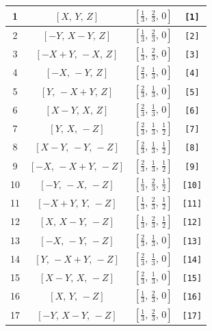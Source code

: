 \documentclass[fleqn,8pt]{jsarticle}
\begin{document}
\begin{longtable}{cccc}
1 & $\left[ X,\, Y,\, Z \right]$ & $\left[ \frac{1}{3},\, \frac{2}{3},\, 0 \right]$ & {\tt [1]} \\ \hline
2 & $\left[ - Y,\, X - Y,\, Z \right]$ & $\left[ \frac{1}{3},\, \frac{2}{3},\, 0 \right]$ & {\tt [2]} \\ \hline
3 & $\left[ - X + Y,\, - X,\, Z \right]$ & $\left[ \frac{1}{3},\, \frac{2}{3},\, 0 \right]$ & {\tt [3]} \\ \hline
4 & $\left[ - X,\, - Y,\, Z \right]$ & $\left[ \frac{2}{3},\, \frac{1}{3},\, 0 \right]$ & {\tt [4]} \\ \hline
5 & $\left[ Y,\, - X + Y,\, Z \right]$ & $\left[ \frac{2}{3},\, \frac{1}{3},\, 0 \right]$ & {\tt [5]} \\ \hline
6 & $\left[ X - Y,\, X,\, Z \right]$ & $\left[ \frac{2}{3},\, \frac{1}{3},\, 0 \right]$ & {\tt [6]} \\ \hline
7 & $\left[ Y,\, X,\, - Z \right]$ & $\left[ \frac{2}{3},\, \frac{1}{3},\, \frac{1}{2} \right]$ & {\tt [7]} \\ \hline
8 & $\left[ X - Y,\, - Y,\, - Z \right]$ & $\left[ \frac{2}{3},\, \frac{1}{3},\, \frac{1}{2} \right]$ & {\tt [8]} \\ \hline
9 & $\left[ - X,\, - X + Y,\, - Z \right]$ & $\left[ \frac{2}{3},\, \frac{1}{3},\, \frac{1}{2} \right]$ & {\tt [9]} \\ \hline
10 & $\left[ - Y,\, - X,\, - Z \right]$ & $\left[ \frac{1}{3},\, \frac{2}{3},\, \frac{1}{2} \right]$ & {\tt [10]} \\ \hline
11 & $\left[ - X + Y,\, Y,\, - Z \right]$ & $\left[ \frac{1}{3},\, \frac{2}{3},\, \frac{1}{2} \right]$ & {\tt [11]} \\ \hline
12 & $\left[ X,\, X - Y,\, - Z \right]$ & $\left[ \frac{1}{3},\, \frac{2}{3},\, \frac{1}{2} \right]$ & {\tt [12]} \\ \hline
13 & $\left[ - X,\, - Y,\, - Z \right]$ & $\left[ \frac{2}{3},\, \frac{1}{3},\, 0 \right]$ & {\tt [13]} \\ \hline
14 & $\left[ Y,\, - X + Y,\, - Z \right]$ & $\left[ \frac{2}{3},\, \frac{1}{3},\, 0 \right]$ & {\tt [14]} \\ \hline
15 & $\left[ X - Y,\, X,\, - Z \right]$ & $\left[ \frac{2}{3},\, \frac{1}{3},\, 0 \right]$ & {\tt [15]} \\ \hline
16 & $\left[ X,\, Y,\, - Z \right]$ & $\left[ \frac{1}{3},\, \frac{2}{3},\, 0 \right]$ & {\tt [16]} \\ \hline
17 & $\left[ - Y,\, X - Y,\, - Z \right]$ & $\left[ \frac{1}{3},\, \frac{2}{3},\, 0 \right]$ & {\tt [17]} \\ \hline

\end{longtable}
\end{document}
